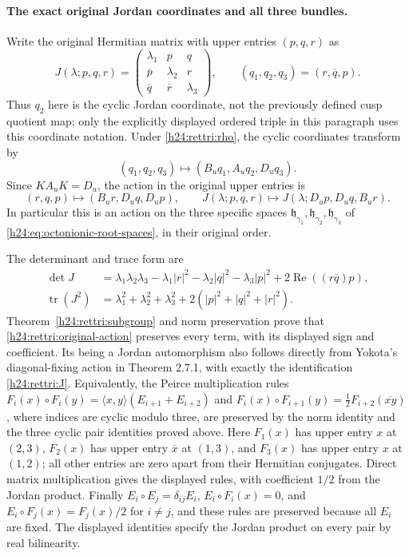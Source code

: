 \paragraph{The exact original Jordan coordinates and all three bundles.}
Write the original Hermitian matrix with upper entries $(p,q,r)$ as
\begin{equation}
 J(\lambda;p,q,r)=
 \begin{pmatrix}
 \lambda_1&p&q\\
 \overline p&\lambda_2&r\\
 \overline q&\overline r&\lambda_3
 \end{pmatrix},\qquad
 (q_1,q_2,q_3)=(r,\overline q,p).
 \label{h24:rettri:J}
\end{equation}
Thus $q_2$ here is the cyclic Jordan coordinate, not the previously
defined cusp quotient map; only the explicitly displayed ordered
triple in this paragraph uses this coordinate notation.
Under \eqref{h24:rettri:rho}, the cyclic coordinates transform by
\[
 (q_1,q_2,q_3)\longmapsto(B_u q_1,A_u q_2,D_u q_3).
\]
Since $K A_u K=D_u$, the action in the original upper entries is
\begin{equation}
 (r,q,p)\longmapsto(B_u r,D_u q,D_u p),\qquad
 J(\lambda;p,q,r)\longmapsto
       J(\lambda;D_u p,D_u q,B_u r).
 \label{h24:rettri:original-action}
\end{equation}
In particular this is an action on the three specific spaces
$\mathfrak h_{\gamma_1},\mathfrak h_{\gamma_2},
\mathfrak h_{\gamma_3}$ of
\eqref{h24:eq:octonionic-root-spaces}, in their original order.

The determinant and trace form are
\begin{align}
 \det J&=\lambda_1\lambda_2\lambda_3
       -\lambda_1|r|^2-\lambda_2|q|^2-\lambda_3|p|^2
       +2\operatorname{Re}((r\overline q)p),
 \label{h24:rettri:det}\\
 \operatorname{tr}(J^2)&=\lambda_1^2+\lambda_2^2+\lambda_3^2
                       +2(|p|^2+|q|^2+|r|^2).
 \label{h24:rettri:metric}
\end{align}
Theorem~\ref{h24:rettri:subgroup} and norm preservation prove that
\eqref{h24:rettri:original-action} preserves every term, with its
displayed sign and coefficient. Its being a Jordan automorphism
also follows directly from Yokota's diagonal-fixing action in
Theorem 2.7.1, with exactly the identification
\eqref{h24:rettri:J}. Equivalently, the Peirce multiplication rules
$F_i(x)\circ F_i(y)=\langle x,y\rangle(E_{i+1}+E_{i+2})$ and
$F_i(x)\circ F_{i+1}(y)=\tfrac12 F_{i+2}(\overline{xy})$,
where indices are cyclic modulo three, are preserved by the norm
identity and the three cyclic pair identities proved above.
Here $F_1(x)$ has upper entry $x$ at $(2,3)$,
$F_2(x)$ has upper entry $\overline x$ at $(1,3)$, and
$F_3(x)$ has upper entry $x$ at $(1,2)$; all other entries are
zero apart from their Hermitian conjugates. Direct matrix
multiplication gives the displayed rules, with coefficient
$1/2$ from the Jordan product. Finally
$E_i\circ E_j=\delta_{ij}E_i$, $E_i\circ F_i(x)=0$,
and $E_i\circ F_j(x)=F_j(x)/2$ for $i\ne j$, and these rules
are preserved because all $E_i$ are fixed. The displayed
identities specify the Jordan product on every pair by real
bilinearity.

